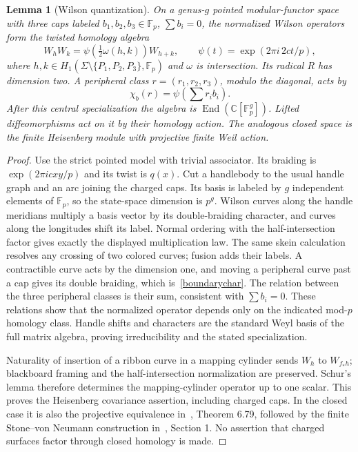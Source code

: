 \documentclass[11pt]{amsart}
\newtheorem{lemma}[theorem]{Lemma}
\newcommand{\Fp}{\mathbb F_p}
\begin{document}
\begin{lemma}[Wilson quantization]\label{wilson}
On a genus-$g$ pointed modular-functor space with three caps labeled
$b_1,b_2,b_3\in\Fp$, $\sum b_i=0$, the normalized Wilson operators
form the twisted homology algebra
\[
W_hW_k=\psi(\tfrac12\omega(h,k))W_{h+k},\qquad
\psi(t)=\exp(2\pi i\,2ct/p),
\]
where $h,k\in H_1(\Sigma\setminus\{P_1,P_2,P_3\},\Fp)$ and
$\omega$ is intersection. Its radical $R$ has dimension two.
A peripheral class $r=(r_1,r_2,r_3)$, modulo the diagonal, acts by
\begin{equation}\label{boundarychar}
\chi_b(r)=\psi\left(\sum r_i b_i\right).
\end{equation}
After this central specialization the algebra is
$\operatorname{End}(\mathbb C[\Fp^g])$. Lifted diffeomorphisms act
on it by their homology action. The analogous closed space is the
finite Heisenberg module with projective finite Weil action.
\end{lemma}
\begin{proof}
Use the strict pointed model with trivial associator. Its braiding is
$\exp(2\pi i c xy/p)$ and its twist is $q(x)$.
Cut a handlebody to the usual
handle graph and an arc joining the charged caps. Its basis is labeled
by $g$ independent elements of $\Fp$, so the state-space dimension
is $p^g$. Wilson curves along the handle meridians multiply a basis
vector by its double-braiding character, and curves along the
longitudes shift its label. Normal ordering with the half-intersection
factor gives exactly the displayed multiplication law. The same
skein calculation resolves any crossing of two colored curves; fusion
adds their labels. A contractible curve acts by the dimension one,
and moving a peripheral curve past a cap gives its double braiding,
which is~\eqref{boundarychar}. The relation between the three
peripheral classes is their sum, consistent with $\sum b_i=0$.
These relations show that the normalized operator depends only on
the indicated mod-$p$ homology class. Handle shifts and characters
are the standard Weyl basis of the full matrix algebra, proving
irreducibility and the stated specialization.

Naturality of insertion of a ribbon curve in a mapping cylinder sends
$W_h$ to $W_{f_*h}$; blackboard framing and the half-intersection
normalization are preserved. Schur's lemma therefore determines the
mapping-cylinder operator up to one scalar. This proves the
Heisenberg covariance assertion, including charged caps. In the
closed case it is also the projective equivalence in~\cite{Stirling},
Theorem 6.79, followed by the finite Stone--von Neumann construction
in~\cite{GH}, Section 1. No assertion that charged surfaces factor
through closed homology is made.
\end{proof}
\end{document}
